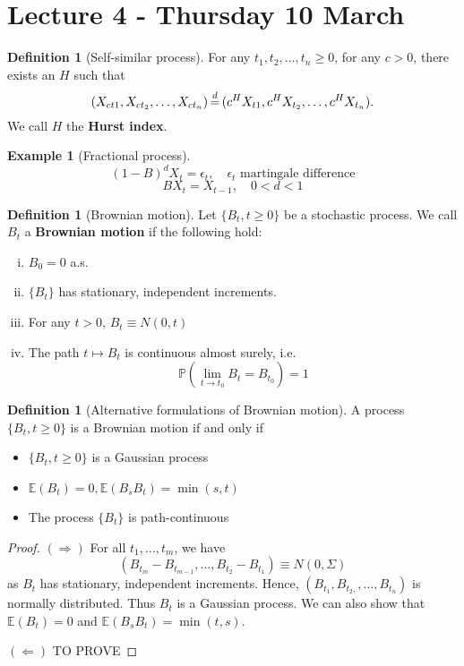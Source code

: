 \documentclass[10pt, oneside, reqno]{amsart}
\theoremstyle{plain}%
\theoremstyle{definition}
\newtheorem{defn}[thm]{Definition}
\newtheorem{exmp}[thm]{Example}
\theoremstyle{remark}
\renewcommand{\P}{\mathbb{P}}
\newcommand{\E}{\mathbb{E}}
\def\eqd{\,{\buildrel d \over =}\,}
\begin{document}
\section{Lecture 4 - Thursday 10 March} %
\label{sec:lecture_4_thursday_10_march}

\begin{defn}[Self-similar process]
	For any $t_1, t_2, \dots, t_n \geq 0$, for any $c > 0$, there exists an $H$ such that \[
		(X_{ct1}, X_{ct_2}, \dots, X_{ct_n}) \eqd 	(c^H X_{t1}, c^H X_{t_2}, \dots, c^H X_{t_n}).
	\]
	We call $H$ the \textbf{Hurst index}.
\end{defn}

\begin{exmp}[Fractional process]
	\[
		(1-B)^d X_t = \epsilon_t, \quad \epsilon_t \text{ martingale difference}
	\]
	\[
		B X_t = X_{t-1}, \quad 0 < d < 1
	\]
\end{exmp}

\begin{defn}[Brownian motion]
	Let $\{ B_t, t \geq 0 \}$ be a stochastic process.  We call $B_t$ a \textbf{Brownian motion} if the following hold:
	\begin{enumerate}[(i)]
		\item $B_0 = 0$ a.s.
		\item $\{B_t \}$ has stationary, independent increments.
		\item For any $t > 0$, $B_t \equiv N(0,t)$
		\item The path $t \mapsto B_t$ is continuous almost surely, i.e.\[
			\P(\lim_{t \rightarrow t_0} B_t = B_{t_0}) = 1
		\]
	\end{enumerate}
\end{defn}

\begin{defn}[Alternative formulations of Brownian motion]
	A process $\{ B_t, t \geq 0 \}$ is a Brownian motion if and only if 
	\begin{itemize}
		\item $\{ B_t, t \geq 0 \}$ is a Gaussian process
		\item $\E(B_t) = 0, \E(B_s B_t) = \min(s,t)$
		\item The process $\{ B_t \}$ is path-continuous
	\end{itemize}
\end{defn}

\begin{proof}
	$(\Rightarrow)$  For all $t_1, \dots, t_m$, we have \[
		(B_{t_m} - B_{t_{m-1}}, \dots, B_{t_2} - B_{t_1}) \equiv N(0, \Sigma)
	\]
	as $B_t$ has stationary, independent increments.  Hence, $(B_{t_1}, B_{t_2,}, \dots, B_{t_n})$ is normally distributed.  Thus $B_t$ is a Gaussian process.  We can also show that $\E(B_t) = 0$ and $\E(B_s B_t) = \min(t,s)$.  
	
	$(\Leftarrow)$ TO PROVE
\end{proof}
\end{document}
